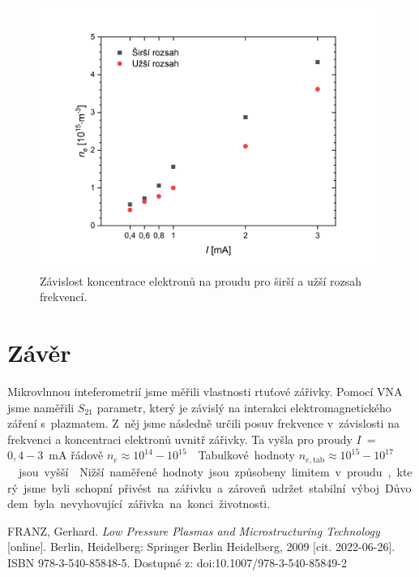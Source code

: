 \documentclass[a4paper,12pt]{article}
\begin{document}
\begin{figure}[h]
	\centering
	\includegraphics[width=0.9\linewidth]{koncnai.png}
	\caption{Závislost koncentrace elektronů na proudu pro širší a užší rozsah 
	frekvencí.}
	\label{koncnai}
\end{figure}

\clearpage
\section{Závěr}
\par Mikrovlnnou inteferometrií jsme měřili vlastnosti rtuťové zářivky. Pomocí 
VNA jsme naměřili $S_{21}$ parametr, který je závislý na interakci 
elektromagnetického záření s~plazmatem. Z~něj jsme následně určili posuv 
frekvence v~závislosti na frekvenci a koncentraci elektronů uvnitř zářivky. Ta 
vyšla pro proudy $I$~=~$0,4-3$~\si{\milli\ampere} řádově $n_e \approx 
10^{14}-10^{15}$~\si{\cubic\per\meter}. Tabulkové 
hodnoty $n_{e,\text{tab}} \approx 10^{15}-10^{17}$~\si{\cubic\per\meter} jsou vyšší \cite{conc}. Nižší naměřené hodnoty jsou způsobeny limitem v proudu,
který jsme byli schopní přivést na zářivku a zároveň udržet stabilní výboj.
Důvodem byla nevyhovující zářivka na konci životnosti.

\begin{thebibliography}{10}
	FRANZ, Gerhard. \textit{Low Pressure Plasmas and Microstructuring 
	Technology} 
	[online]. Berlin, Heidelberg: Springer Berlin Heidelberg, 2009 [cit. 
	2022-06-26]. ISBN 978-3-540-85848-5. Dostupné z: 
	doi:10.1007/978-3-540-85849-2
\end{thebibliography}
\end{document}
